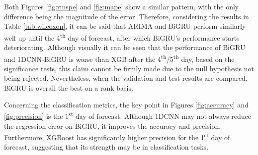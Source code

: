 \documentclass[ %
                    author={Raj Dhakan},
                supervisor={Dr. Ayush Joshi},
                    degree={MSc},
                     title={Ethereum Price Prediction using Internal and External Factors},
                  subtitle={},
                      type={},
                      year={2025}]{dissertation}
\begin{document}
Both Figures \ref{fig:rmspe} and \ref{fig:mape} show a similar pattern, with the only difference being the magnitude of the error. Therefore, considering the results in Table \ref{tab:wilcoxon}, it can be said that ARIMA and BiGRU perform similarly well up until the 4\textsuperscript{th} day of forecast, after which BiGRU's performance starts deteriorating. Although visually it can be seen that the performance of BiGRU and 1DCNN-BiGRU is worse than XGB after the 4\textsuperscript{th}/5\textsuperscript{th} day, based on the significance tests, this claim cannot be firmly made due to the null hypothesis not being rejected. Nevertheless, when the validation and test results are compared, BiGRU is overall the best on a rank basis.

Concerning the classification metrics, the key point in Figures \ref{fig:accuracy} and \ref{fig:precision} is the 1\textsuperscript{st} day of forecast. Although 1DCNN may not always reduce the regression error on BiGRU, it improves the accuracy and precision. Furthermore, XGBoost has significantly higher precision for the 1\textsuperscript{st} day of forecast, suggesting that its strength may be in classification tasks.
\end{document}
